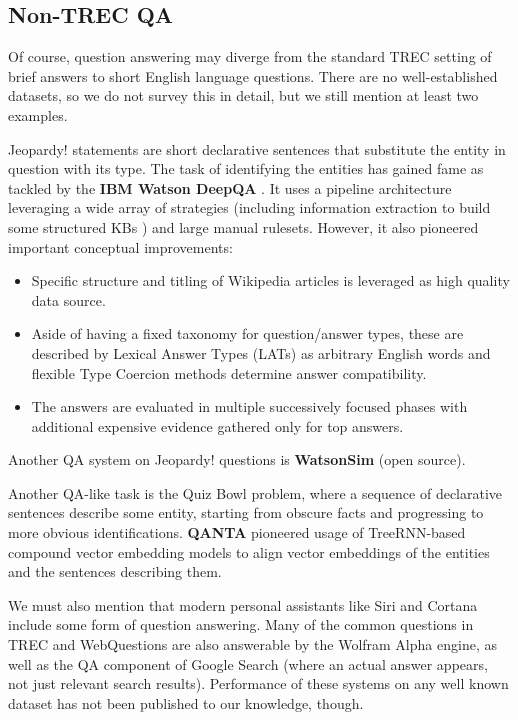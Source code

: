 \subsection{Non-TREC QA}

Of course, question answering may diverge from the standard TREC
setting of brief answers to short English language questions.
There are no well-established datasets, so we do not survey this
in detail, but we still mention at least two examples.

Jeopardy! statements are short declarative sentences that substitute
the entity in question with its type.
The task of identifying the entities has gained fame as tackled
by the \textbf{IBM Watson DeepQA} \citep{WatsonOverview, WatsonIntro}.
It uses a pipeline architecture leveraging a wide array of strategies
(including information extraction to build some structured KBs \citep{WatsonRelEx})
and large manual rulesets.
However, it also pioneered important conceptual improvements:
\begin{itemize}
	\item Specific structure and titling of Wikipedia articles is leveraged as high quality data source. \citep{WatsonIR}
	\item Aside of having a fixed taxonomy for question/answer types, these are described by Lexical Answer Types (LATs) as arbitrary English words and flexible Type Coercion methods determine answer compatibility. \citep{WatsonTyCor}
	\item The answers are evaluated in multiple successively focused phases with additional expensive evidence gathered only for top answers. \citep{WatsonScoring}
\end{itemize}
Another QA system on Jeopardy! questions is \textbf{WatsonSim} \citep{WatsonSim}
(open source).

Another QA-like task is the Quiz Bowl problem, where a sequence
of declarative sentences describe some entity, starting from
obscure facts and progressing to more obvious identifications.
\textbf{QANTA} \citep{QANTA} pioneered usage of TreeRNN-based compound
vector embedding models to align vector embeddings of the entities
and the sentences describing them.

We must also mention that modern personal assistants like Siri and Cortana
include some form of question answering.
Many of the common questions in TREC and WebQuestions are also answerable
by the Wolfram Alpha engine, as well as the QA component of Google Search
(where an actual answer appears, not just relevant search results).
Performance of these systems on any well known dataset has not been
published to our knowledge, though.




